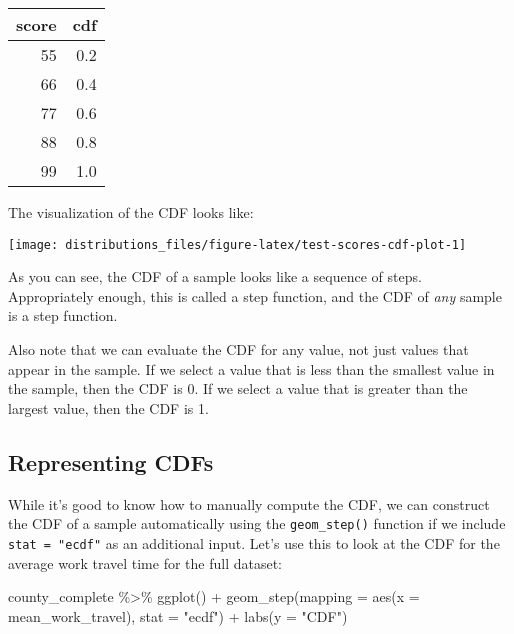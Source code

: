 \documentclass[
]{book}
\newenvironment{Shaded}{\begin{snugshade}}{\end{snugshade}}
\newcommand{\AttributeTok}[1]{\textcolor[rgb]{0.77,0.63,0.00}{#1}}
\newcommand{\FunctionTok}[1]{\textcolor[rgb]{0.00,0.00,0.00}{#1}}
\newcommand{\NormalTok}[1]{#1}
\newcommand{\SpecialCharTok}[1]{\textcolor[rgb]{0.00,0.00,0.00}{#1}}
\newcommand{\StringTok}[1]{\textcolor[rgb]{0.31,0.60,0.02}{#1}}
\begin{document}
\begin{table}
\centering
\begin{tabular}{r|r}
\hline
score & cdf\\
\hline
55 & 0.2\\
\hline
66 & 0.4\\
\hline
77 & 0.6\\
\hline
88 & 0.8\\
\hline
99 & 1.0\\
\hline
\end{tabular}
\end{table}

The visualization of the CDF looks like:

\begin{center}\texttt{[image: distributions\_files/figure-latex/test-scores-cdf-plot-1]} \end{center}

As you can see, the CDF of a sample looks like a sequence of steps.
Appropriately enough, this is called a step function, and the CDF of \emph{any} sample is a step function.

Also note that we can evaluate the CDF for any value, not just values that appear in the sample.
If we select a value that is less than the smallest value in the sample, then the CDF is 0.
If we select a value that is greater than the largest value, then the CDF is 1.

\hypertarget{representing-cdfs}{%
\subsection{Representing CDFs}\label{representing-cdfs}}

While it's good to know how to manually compute the CDF, we can construct the CDF of a sample automatically using the \texttt{geom\_step()} function if we include \texttt{stat\ =\ "ecdf"} as an additional input.
Let's use this to look at the CDF for the average work travel time for the full dataset:

\begin{Shaded}
\begin{Highlighting}[]
\NormalTok{county\_complete }\SpecialCharTok{\%\textgreater{}\%}
  \FunctionTok{ggplot}\NormalTok{() }\SpecialCharTok{+}
  \FunctionTok{geom\_step}\NormalTok{(}\AttributeTok{mapping =} \FunctionTok{aes}\NormalTok{(}\AttributeTok{x =}\NormalTok{ mean\_work\_travel), }\AttributeTok{stat =} \StringTok{"ecdf"}\NormalTok{) }\SpecialCharTok{+}
  \FunctionTok{labs}\NormalTok{(}\AttributeTok{y =} \StringTok{"CDF"}\NormalTok{)}
\end{Highlighting}
\end{Shaded}
\end{document}
